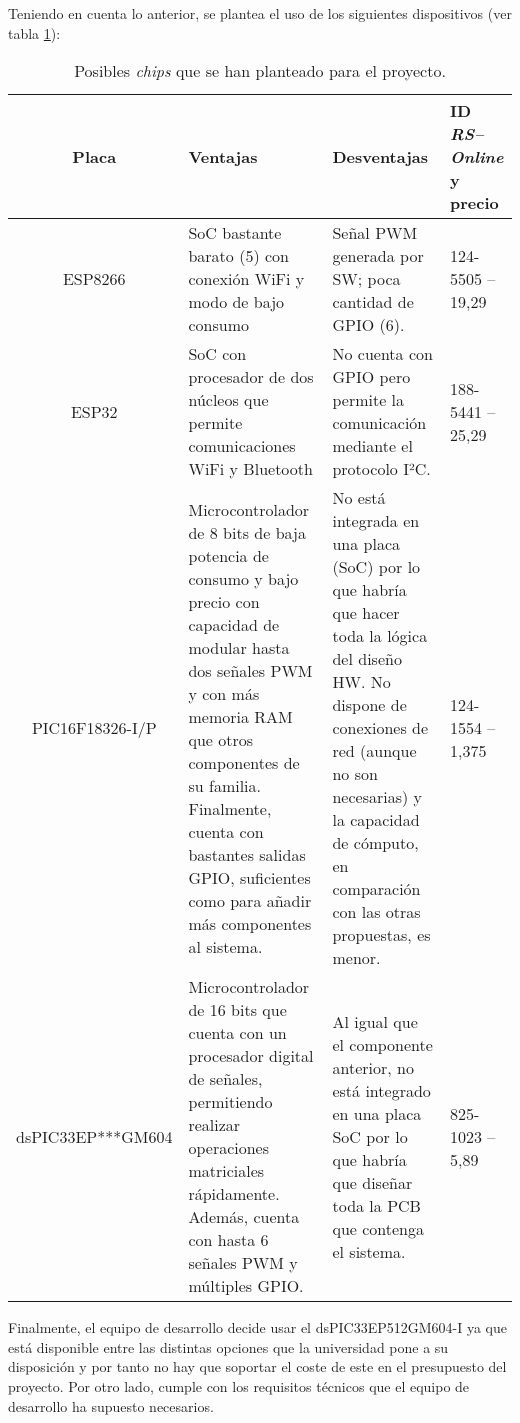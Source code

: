 Teniendo en cuenta lo anterior, se plantea el uso de los siguientes dispositivos (ver tabla \ref{tab:s2_chips}):

\begin{table}[H]
    \centering
    \begin{tabularx}{\textwidth}{| c | X | X | X |}
        \hline
        \textbf{Placa} & \textbf{Ventajas} & \textbf{Desventajas} & \textbf{ID \textit{RS--Online} y precio} \\
        \hline
        ESP8266 & \ac{SoC} bastante barato (5\EUR{}) con conexión WiFi y modo de bajo consumo & Señal \ac{PWM} generada por \ac{SW}; poca cantidad de \ac{GPIO} (6). & 124-5505 -- 19,29\EUR{} \\
        \hline
        ESP32 & \ac{SoC} con procesador de dos núcleos que permite comunicaciones WiFi y Bluetooth & No cuenta con \ac{GPIO} pero permite la comunicación mediante el protocolo I²C. & 188-5441 -- 25,29\EUR{} \\
        \hline
        PIC16F18326-I/P & Microcontrolador de 8 bits de baja potencia de consumo y bajo precio con capacidad de modular hasta dos señales \ac{PWM} y con más memoria RAM que otros componentes de su familia. Finalmente, cuenta con bastantes salidas \ac{GPIO}, suficientes como para añadir más componentes al sistema. & No está integrada en una placa (\ac{SoC}) por lo que habría que hacer toda la lógica del diseño \ac{HW}. No dispone de conexiones de red (aunque no son necesarias) y la capacidad de cómputo, en comparación con las otras propuestas, es menor. & 124-1554 -- 1,375\EUR{} \\
        \hline
        dsPIC33EP***GM604 & Microcontrolador de 16 bits que cuenta con un procesador digital de señales, permitiendo realizar operaciones matriciales rápidamente. Además, cuenta con hasta 6 señales \ac{PWM} y múltiples GPIO. & Al igual que el componente anterior, no está integrado en una placa \ac{SoC} por lo que habría que diseñar toda la PCB que contenga el sistema. & 825-1023 -- 5,89\EUR{} \\
        \hline
    \end{tabularx}
    \caption{Posibles \textit{chips} que se han planteado para el proyecto.}
    \label{tab:s2_chips}
\end{table}

Finalmente, el equipo de desarrollo decide usar el dsPIC33EP512GM604-I ya que está disponible entre las distintas opciones que la universidad pone a su disposición y por tanto no hay que soportar el coste de este en el presupuesto del proyecto. Por otro lado, cumple con los requisitos técnicos que el equipo de desarrollo ha supuesto necesarios.


